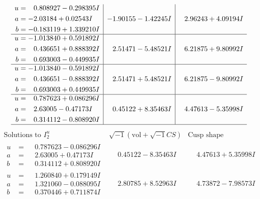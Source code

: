 \documentclass[1p]{elsarticle_modified}
\theoremstyle{definition}
\newcommand{\I}{\sqrt{-1}}
\begin{document}
$$\begin{array}{c|c|c}
\begin{aligned}
u &= \phantom{-}0.808927 - 0.298395 I \\
a &= -2.03184 + 0.02543 I \\
b &= -0.183119 + 1.339210 I\end{aligned}
 & -1.90155 - 1.42245 I & \phantom{-}2.96243 + 4.09194 I \\ \hline\begin{aligned}
u &= -1.013840 + 0.591892 I \\
a &= \phantom{-}0.436651 + 0.888392 I \\
b &= \phantom{-}0.693003 - 0.449935 I\end{aligned}
 & \phantom{-}2.51471 - 5.48521 I & \phantom{-}6.21875 + 9.80992 I \\ \hline\begin{aligned}
u &= -1.013840 - 0.591892 I \\
a &= \phantom{-}0.436651 - 0.888392 I \\
b &= \phantom{-}0.693003 + 0.449935 I\end{aligned}
 & \phantom{-}2.51471 + 5.48521 I & \phantom{-}6.21875 - 9.80992 I \\ \hline\begin{aligned}
u &= \phantom{-}0.787623 + 0.086296 I \\
a &= \phantom{-}2.63005 - 0.47173 I \\
b &= \phantom{-}0.314112 - 0.808920 I\end{aligned}
 & \phantom{-}0.45122 + 8.35463 I & \phantom{-}4.47613 - 5.35998 I\\
 \hline 
 \end{array}$$\newpage$$\begin{array}{c|c|c}  
\text{Solutions to }I^u_{2}& \I (\text{vol} + \sqrt{-1}CS) & \text{Cusp shape}\\
 \hline 
\begin{aligned}
u &= \phantom{-}0.787623 - 0.086296 I \\
a &= \phantom{-}2.63005 + 0.47173 I \\
b &= \phantom{-}0.314112 + 0.808920 I\end{aligned}
 & \phantom{-}0.45122 - 8.35463 I & \phantom{-}4.47613 + 5.35998 I \\ \hline\begin{aligned}
u &= \phantom{-}1.260840 + 0.179149 I \\
a &= \phantom{-}1.321060 - 0.088095 I \\
b &= \phantom{-}0.370446 + 0.711874 I\end{aligned}
 & \phantom{-}2.80785 + 8.52963 I & \phantom{-}4.73872 - 7.98573 I \\ \hline\begin{aligned}

\end{aligned}
\end{array}$$
\end{document}
